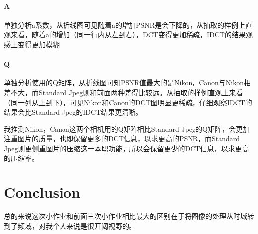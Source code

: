 \documentclass[UTF8]{ctexart}
\begin{document}
	\paragraph{A} 单独分析a系数，从折线图可见随着a的增加PSNR是会下降的，从抽取的样例上直观来看，随着a的增加（同一行内从左到右），DCT变得更加稀疏，IDCT的结果观感上变得更加模糊
	
	\paragraph{Q} 单独分析使用的Q矩阵，从折线图可知PSNR值最大的是Nikon，Canon与Nikon相差不大，而Standard Jpeg则和前面两种差得比较远。从抽取的样例直观上来看（同一列从上到下），可见Nikon和Canon的DCT图明显更稀疏，仔细观察IDCT的结果会比Standard Jpeg的IDCT结果更清晰。
	
	我推测Nikon，Canon这两个相机用的Q矩阵相比Standard Jpeg的Q矩阵，会更加注重图片的质量，也即保留更多的DCT信息，以求更高的PSNR，而Standard Jpeg则更侧重图片的压缩这一本职功能，所以会保留更少的DCT信息，以求更高的压缩率。
	
	\section{Conclusion}
	
	总的来说这次小作业和前面三次小作业相比最大的区别在于将图像的处理从时域转到了频域，对我个人来说是很开阔视野的。
	
\end{document}
